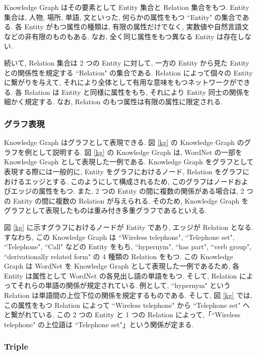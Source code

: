 Knowledge Graph はその要素として Entity 集合と Relation 集合をもつ. Entity 集合は, 人物, 場所, 単語, 文といった, 何らかの属性をもつ ``Entity" の集合である. 各 Entity がもつ属性の種類は, 有限の属性だけでなく, 実数値や自然言語文などの非有限のものもある. なお, 全く同じ属性をもつ異なる Entity は存在しない. \par
続いて, Relation 集合は 2 つの Entity に対して, 一方の Entity から見た Entity との関係性を規定する ``Relation" の集合である. Relation によって個々の Entity に繋がりを与えて, それにより全体として有用な意味をもつネットワークができる. 各 Relation は Entity と同様に属性をもち, それにより Entity 同士の関係を細かく規定する. なお, Relation のもつ属性は有限の属性に限定される. \par

\subsubsection{グラフ表現}

Knowledge Graph はグラフとして表現できる. 図 \ref{kg} の Knowledge Graph のグラフを例として説明する. 図 \ref{kg} の Knowledge Graph は, WordNet の一部を Knowledge Graph として表現した一例である. Knowledge Graph をグラフとして表現する際には一般的に, Entity をグラフにおけるノード, Relation をグラフにおけるエッジとする. このようにして構成されるため, このグラフはノードおよびエッジの属性をもつ. また, 2 つの Entity の間に複数の関係がある場合は, 2 つの Entity の間に複数の Relation が与えられる. そのため, Knowledge Graph をグラフとして表現したものは重み付き多重グラフであるといえる. \par
図 \ref{kg} に示すグラフにおけるノードが Entity であり, エッジが Relation となる. すなわち, この Knowledge Graph は ``Wireless telephone", ``Telephone set", ``Telephone", ``Call" などの Entity をもち, ``hypernym", ``has part", ``verb group", ``derivationally related form" の 4 種類の Relation をもつ. この Knowledge Graph は WordNet \cite{Wordnet} を Knowledge Graph として表現した一例であるため, 各 Entity は属性として WordNet の各見出し語の単語をもつ. そして, Relation によってそれらの単語の関係が規定されている. 例として, ``hypernym" という Relation は単語間の上位下位の関係を規定するものである. そして, 図 \ref{kg} では, この属性をもつ Relation によって ``Wireless telephone" から ``Telephone set" へと繋がれている. この 2 つの Entity と 1 つの Relation によって,「``Wireless telephone" の上位語は ``Telephone set"」という関係が定まる. \par

\subsubsection{Triple}

